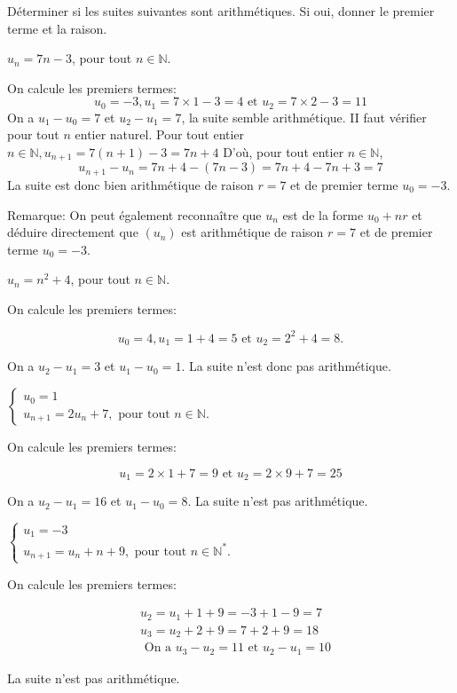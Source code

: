 \documentclass[11pt,a4paper]{article}  %
\begin{document}

Déterminer si les suites suivantes sont arithmétiques. Si oui, donner le premier terme et la raison.
	\begin{enumMet}
	\item $u_n=7 n-3$, pour tout $n \in \mathbb{N}$.
	\begin{corrBox}
		On calcule les premiers termes:
		$$
		u_0=-3, u_1=7 \times 1-3=4 \text { et } u_2=7 \times 2-3=11
		$$
		On a $u_1-u_0=7$ et $u_2-u_1=7$, la suite semble arithmétique. II faut vérifier pour tout $n$ entier naturel.
		Pour tout entier $n \in \mathbb{N}, u_{n+1}=7(n+1)-3=7 n+4$
		D'où, pour tout entier $n \in \mathbb{N}$,
		$$
		u_{n+1}-u_n=7 n+4-(7 n-3)=7 n+4-7 n+3=7
		$$
		La suite est donc bien arithmétique de raison $r=7$ et de premier terme $u_0=-3$.
		
		Remarque: On peut également reconnaître que $u_n$ est de la forme $u_0+n r$ et déduire directement que $\left(u_n\right)$ est arithmétique de raison $r=7$ et de premier terme $u_0=-3$.		
	\end{corrBox}
	\item $u_n=n^2+4$, pour tout $n \in \mathbb{N}$.
	\begin{corrBox}
		On calcule les premiers termes:
		
		$$
		u_0=4, u_1=1+4=5 \text { et } u_2=2^2+4=8 .
		$$
		
		
		On a $u_2-u_1=3$ et $u_1-u_0=1$.
		La suite n'est donc pas arithmétique.	
	\end{corrBox}
	\item $\left\{\begin{array}{l}u_0=1 \\ u_{n+1}=2 u_n+7, \text { pour tout } n \in \mathbb{N} \text {. }\end{array}\right.$
	\begin{corrBox}
		On calcule les premiers termes:
		
		$$
		u_1=2 \times 1+7=9 \text { et } u_2=2 \times 9+7=25
		$$
		
		
		On a $u_2-u_1=16$ et $u_1-u_0=8$.
		La suite n'est pas arithmétique.		
	\end{corrBox}
	\item $\left\{\begin{array}{l}u_1=-3 \\ u_{n+1}=u_n+n+9, \text { pour tout } n \in \mathbb{N}^* .\end{array}\right.$
	\begin{corrBox}
		On calcule les premiers termes:
		
		$$
		\begin{aligned}
			& u_2=u_1+1+9=-3+1-9=7 \\
			& u_3=u_2+2+9=7+2+9=18 \\
			& \text { On a } u_3-u_2=11 \text { et } u_2-u_1=10
		\end{aligned}
		$$
		
		
		La suite n'est pas arithmétique.			
	\end{corrBox}
\end{enumMet}
\end{document}
